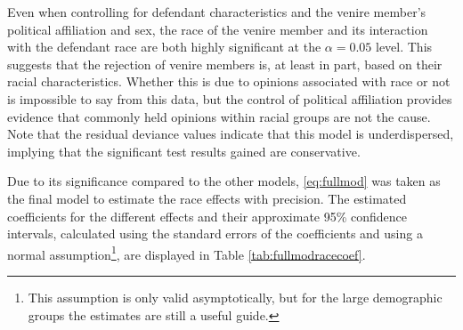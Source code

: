 Even when controlling for defendant characteristics and the venire member's political affiliation and sex, the race of the venire
member and its interaction with the defendant race are both highly significant at the $\alpha = 0.05$ level. This suggests that
the rejection of venire members is, at least in part, based on their racial characteristics. Whether this is due to opinions
associated with race or not is impossible to say from this data, but the control of political affiliation provides evidence
that commonly held opinions within racial groups are not the cause. Note that the residual deviance values indicate that this model
is underdispersed, implying that the significant test results gained
are conservative.

Due to its significance compared to the other models, \ref{eq:fullmod} was taken as the final model to estimate the race effects
with precision. The estimated coefficients for the different effects and their approximate 95\% confidence intervals, calculated
using the standard errors of the coefficients and using a normal assumption\footnote{This assumption is only valid asymptotically,
  but for the large demographic groups the estimates are still a useful guide.}, are displayed in Table
\ref{tab:fullmodracecoef}.

